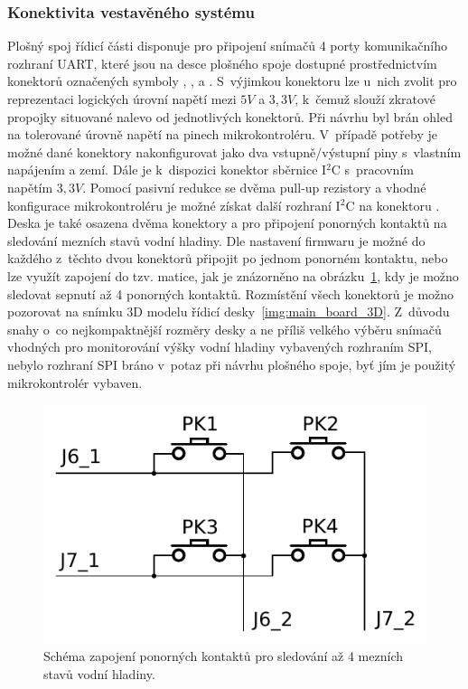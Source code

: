         \subsubsection{Konektivita vestavěného systému}
            Plošný spoj řídicí části disponuje pro připojení snímačů 4 porty komunikačního rozhraní UART, které jsou na desce plošného spoje dostupné prostřednictvím konektorů označených symboly , ,  a . S~výjimkou konektoru  lze u~nich zvolit pro reprezentaci logických úrovní napětí mezi $5\unit{V}$ a $3,3\unit{V}$, k~čemuž slouží zkratové propojky situované nalevo od jednotlivých konektorů. Při návrhu byl brán ohled na tolerované úrovně napětí na pinech mikrokontroléru. V~případě potřeby je možné dané konektory nakonfigurovat jako dva vstupně/výstupní piny s~vlastním napájením a zemí. Dále je k~dispozici konektor  sběrnice I$^2$C s~pracovním napětím $3,3\unit{V}$. Pomocí pasivní redukce se dvěma pull-up rezistory a vhodné konfigurace mikrokontroléru je možné získat další rozhraní I$^2$C na konektoru . Deska je také osazena dvěma konektory  a  pro připojení ponorných kontaktů na sledování mezních stavů vodní hladiny. Dle nastavení firmwaru je možné do každého z~těchto dvou konektorů připojit po jednom ponorném kontaktu, nebo lze využít zapojení do tzv. matice, jak je znázorněno na obrázku~\ref{img:matrix}, kdy je možno sledovat sepnutí až 4 ponorných kontaktů. Rozmístění všech konektorů je možno pozorovat na snímku 3D modelu řídicí desky~\ref{img:main_board_3D}. Z~důvodu snahy o~co nejkompaktnější rozměry desky a ne příliš velkého výběru snímačů vhodných pro monitorování výšky vodní hladiny vybavených rozhraním SPI, nebylo rozhraní SPI bráno v~potaz při návrhu plošného spoje, byť jím je použitý mikrokontrolér vybaven.

            \begin{figure}[h]
                \centering
                \includegraphics[width=0.6\linewidth]{obrazky-figures/matrix.pdf}
                \caption{Schéma zapojení ponorných kontaktů pro sledování až 4 mezních stavů vodní hladiny.}
                \label{img:matrix}
            \end{figure}

